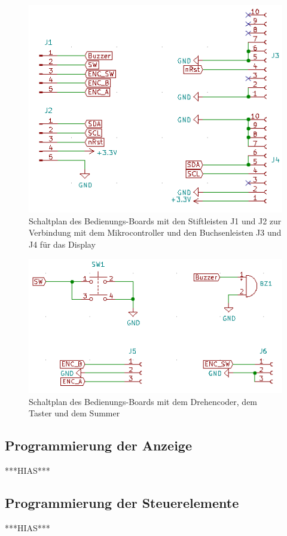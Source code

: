 \begin{figure}[H] %
\includegraphics[width=.75\textwidth]{sec6/images/Display_PCB} 
\centering
\captionsetup{width=.95\textwidth}
\caption[Schaltplan des Bedienungs-Boards 1]{Schaltplan des Bedienungs-Boards mit den Stiftleisten J1 und J2 zur Verbindung mit dem Mikrocontroller und den Buchsenleisten J3 und J4 für das Display}\centering
\label{fig:BedienungsBoard1}
\end{figure}

\begin{figure}[H] %
\includegraphics[width=.90\textwidth]{sec6/images/Display_PCB2} 
\centering
\captionsetup{width=.95\textwidth}
\caption[Schaltplan des Bedienungs-Boards 2]{Schaltplan des Bedienungs-Boards mit dem Drehencoder, dem Taster und dem Summer}\centering
\label{fig:BedienungsBoard2}
\end{figure}


\subsection{Programmierung der Anzeige}\label{Sec6Sub2}
***HIAS***


\subsection{Programmierung der Steuerelemente}\label{Sec6Sub3}
***HIAS***



\newpage